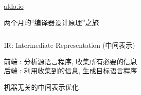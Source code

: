 \begin{frame}{}

  \begin{center}
    \href{https://alda.io/}{alda.io}
  \end{center}
\end{frame}

\begin{frame}{}
  \begin{center}
    {\large 两个月的``编译器设计原理''之旅}

    \vspace{0.30cm}
    \begin{columns}
    \end{columns}
  \end{center}
\end{frame}


\begin{frame}{}
  \begin{center}
    IR: Intermediate Representation (中间表示)
    \vspace{0.50cm}


    \vspace{0.50cm}
    前端 : 分析源语言程序, 收集所有必要的信息 \\[8pt]
    后端 : 利用收集到的信息, 生成目标语言程序
  \end{center}
\end{frame}

\begin{frame}{}
  \begin{center}

    \vspace{0.50cm}
    机器无关的中间表示优化
  \end{center}
\end{frame}

